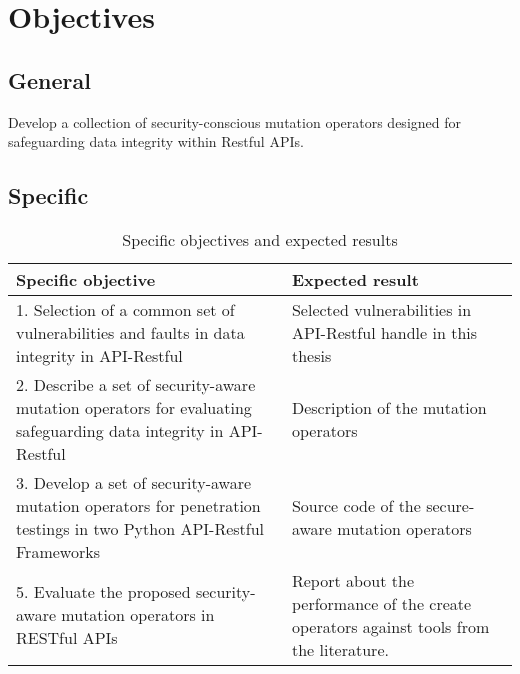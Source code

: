 \section{Objectives}

\subsection{General}

Develop a collection of security-conscious mutation operators designed for safeguarding data integrity within Restful APIs.
\subsection{Specific}

\begin{table}[H]
    \centering
    \begin{tabular}{|p{}|p{}|}
        \hline
         \textbf{Specific objective} & \textbf{Expected result} \\ \hline
         1.  Selection of a common set of vulnerabilities and faults in data integrity in API-Restful &   Selected vulnerabilities in API-Restful handle in this thesis  \\  \hline
         2. Describe a set of security-aware mutation operators for evaluating safeguarding data integrity in API-Restful & Description of the mutation operators \\  \hline
         3. Develop a set of security-aware mutation operators for penetration testings in two Python API-Restful Frameworks & Source code of the secure-aware mutation operators \\  \hline
         5. Evaluate the proposed security-aware mutation operators in RESTful APIs & Report about the performance of the create operators against tools from the literature.
         \\ \hline
    \end{tabular}
    \caption{Specific objectives and expected results}
    \label{tab:objetivos}
\end{table}